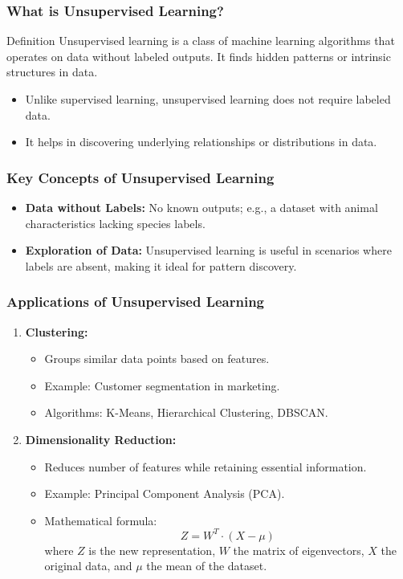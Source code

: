 \documentclass{beamer}
\begin{document}
\begin{frame}[fragile]
    \frametitle{What is Unsupervised Learning?}
    \begin{block}{Definition}
        Unsupervised learning is a class of machine learning algorithms that operates on data without labeled outputs. 
        It finds hidden patterns or intrinsic structures in data.
    \end{block}
    
    \begin{itemize}
        \item Unlike supervised learning, unsupervised learning does not require labeled data.
        \item It helps in discovering underlying relationships or distributions in data.
    \end{itemize}
\end{frame}

\begin{frame}[fragile]
    \frametitle{Key Concepts of Unsupervised Learning}
    \begin{itemize}
        \item \textbf{Data without Labels:} No known outputs; e.g., a dataset with animal characteristics lacking species labels.
        \item \textbf{Exploration of Data:} Unsupervised learning is useful in scenarios where labels are absent, making it ideal for pattern discovery.
    \end{itemize}
\end{frame}

\begin{frame}[fragile]
    \frametitle{Applications of Unsupervised Learning}
    \begin{enumerate}
        \item \textbf{Clustering:}
            \begin{itemize}
                \item Groups similar data points based on features.
                \item Example: Customer segmentation in marketing.
                \item Algorithms: K-Means, Hierarchical Clustering, DBSCAN.
            \end{itemize}
        \item \textbf{Dimensionality Reduction:}
            \begin{itemize}
                \item Reduces number of features while retaining essential information.
                \item Example: Principal Component Analysis (PCA).
                \item Mathematical formula: 
                \begin{equation}
                    Z = W^T \cdot (X - \mu)
                \end{equation}
                where \( Z \) is the new representation, \( W \) the matrix of eigenvectors, \( X \) the original data, and \( \mu \) the mean of the dataset.
            \end{itemize}
    \end{enumerate}
\end{frame}
\end{document}
